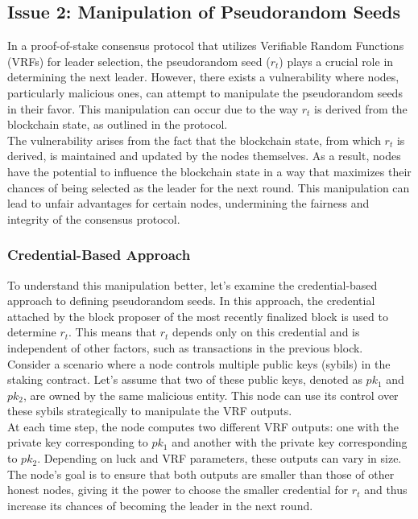 \subsection{Issue 2: Manipulation of Pseudorandom Seeds}
In a proof-of-stake consensus protocol that utilizes Verifiable Random Functions (VRFs) for leader selection, the pseudorandom seed ($r_t$) plays a crucial role in determining the next leader. However, there exists a vulnerability where nodes, particularly malicious ones, can attempt to manipulate the pseudorandom seeds in their favor. This manipulation can occur due to the way $r_t$ is derived from the blockchain state, as outlined in the protocol.\\
The vulnerability arises from the fact that the blockchain state, from which $r_t$ is derived, is maintained and updated by the nodes themselves. As a result, nodes have the potential to influence the blockchain state in a way that maximizes their chances of being selected as the leader for the next round. This manipulation can lead to unfair advantages for certain nodes, undermining the fairness and integrity of the consensus protocol.

\subsubsection{Credential-Based Approach}
To understand this manipulation better, let's examine the credential-based approach to defining pseudorandom seeds. In this approach, the credential attached by the block proposer of the most recently finalized block is used to determine $r_t$. This means that $r_t$ depends only on this credential and is independent of other factors, such as transactions in the previous block.\\
Consider a scenario where a node controls multiple public keys (sybils) in the staking contract. Let's assume that two of these public keys, denoted as $pk_1$ and $pk_2$, are owned by the same malicious entity. This node can use its control over these sybils strategically to manipulate the VRF outputs.\\
At each time step, the node computes two different VRF outputs: one with the private key corresponding to $pk_1$ and another with the private key corresponding to $pk_2$. Depending on luck and VRF parameters, these outputs can vary in size. The node's goal is to ensure that both outputs are smaller than those of other honest nodes, giving it the power to choose the smaller credential for $r_t$ and thus increase its chances of becoming the leader in the next round.

